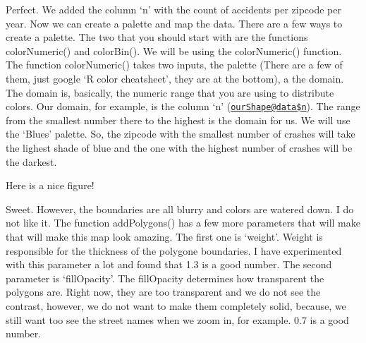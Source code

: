 \documentclass[]{book}
\newenvironment{Shaded}{\begin{snugshade}}{\end{snugshade}}
\newcommand{\CommentTok}[1]{\textcolor[rgb]{0.56,0.35,0.01}{\textit{#1}}}
\newcommand{\DataTypeTok}[1]{\textcolor[rgb]{0.13,0.29,0.53}{#1}}
\newcommand{\DecValTok}[1]{\textcolor[rgb]{0.00,0.00,0.81}{#1}}
\newcommand{\FloatTok}[1]{\textcolor[rgb]{0.00,0.00,0.81}{#1}}
\newcommand{\KeywordTok}[1]{\textcolor[rgb]{0.13,0.29,0.53}{\textbf{#1}}}
\newcommand{\NormalTok}[1]{#1}
\newcommand{\OperatorTok}[1]{\textcolor[rgb]{0.81,0.36,0.00}{\textbf{#1}}}
\newcommand{\StringTok}[1]{\textcolor[rgb]{0.31,0.60,0.02}{#1}}
\begin{document}
Perfect. We added the column `n' with the count of accidents per zipcode per year. Now we can create a palette and map the data. There are a few ways to create a palette. The two that you should start with are the functions colorNumeric() and colorBin(). We will be using the colorNumeric() function. The function colorNumeric() takes two inputs, the palette (There are a few of them, just google `R color cheatsheet', they are at the bottom), a the domain. The domain is, basically, the numeric range that you are using to distribute colors. Our domain, for example, is the column `n' (\href{mailto:ourShape@data$n}{\nolinkurl{ourShape@data\$n}}). The range from the smallest number there to the highest is the domain for us. We will use the `Blues' palette. So, the zipcode with the smallest number of crashes will take the lighest shade of blue and the one with the highest number of crashes will be the darkest.

\begin{Shaded}
\end{Shaded}

\hypertarget{htmlwidget-7e32d79aee2bc3c65ee4}{}

\label{fig:nice-fig88}Here is a nice figure!

Sweet. However, the boundaries are all blurry and colors are watered down. I do not like it. The function addPolygons() has a few more parameters that will make that will make this map look amazing. The first one is `weight'. Weight is responsible for the thickness of the polygone boundaries. I have experimented with this parameter a lot and found that 1.3 is a good number. The second parameter is `fillOpacity'. The fillOpacity determines how transparent the polygons are. Right now, they are too transparent and we do not see the contrast, however, we do not want to make them completely solid, because, we still want too see the street names when we zoom in, for example. 0.7 is a good number.
\end{document}
